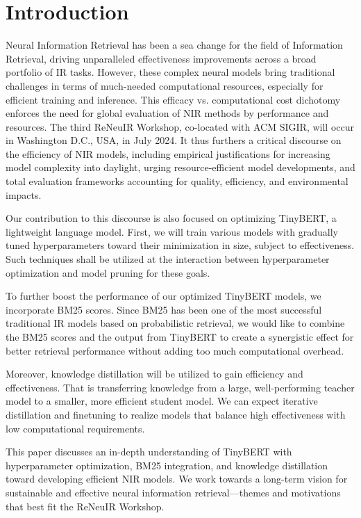 
\section{Introduction}

Neural Information Retrieval has been a sea change for the field of Information Retrieval, driving unparalleled effectiveness improvements across a broad portfolio of IR tasks. However, these complex neural models bring traditional challenges in terms of much-needed computational resources, especially for efficient training and inference. This efficacy vs. computational cost dichotomy enforces the need for global evaluation of NIR methods by performance and resources. The third ReNeuIR Workshop, co-located with ACM SIGIR, will occur in Washington D.C., USA, in July 2024. It thus furthers a critical discourse on the efficiency of NIR models, including empirical justifications for increasing model complexity into daylight, urging resource-efficient model developments, and total evaluation frameworks accounting for quality, efficiency, and environmental impacts.

Our contribution to this discourse is also focused on optimizing TinyBERT, a lightweight language model. First, we will train various models with gradually tuned hyperparameters toward their minimization in size, subject to effectiveness. Such techniques shall be utilized at the interaction between hyperparameter optimization and model pruning for these goals.

To further boost the performance of our optimized TinyBERT models, we incorporate BM25 scores. Since BM25 has been one of the most successful traditional IR models based on probabilistic retrieval, we would like to combine the BM25 scores and the output from TinyBERT to create a synergistic effect for better retrieval performance without adding too much computational overhead.

Moreover, knowledge distillation will be utilized to gain efficiency and effectiveness. That is transferring knowledge from a large, well-performing teacher model to a smaller, more efficient student model. We can expect iterative distillation and finetuning to realize models that balance high effectiveness with low computational requirements.

This paper discusses an in-depth understanding of TinyBERT with hyperparameter optimization, BM25 integration, and knowledge distillation toward developing efficient NIR models. We work towards a long-term vision for sustainable and effective neural information retrieval—themes and motivations that best fit the ReNeuIR Workshop. 

